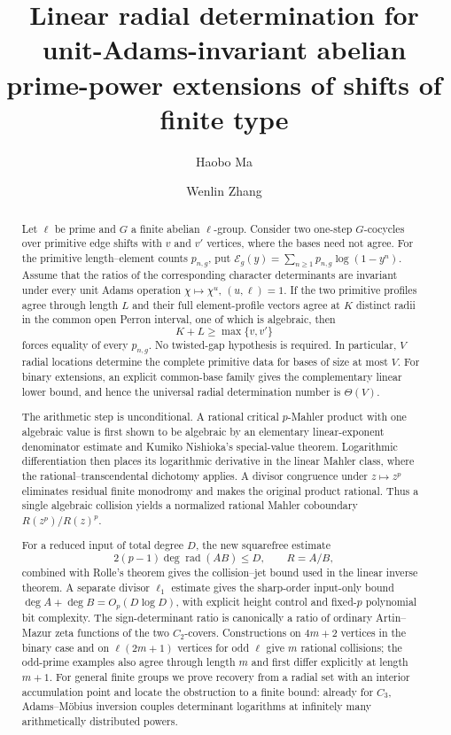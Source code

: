 \documentclass[11pt,a4paper]{amsart}
\title[Linear radial determination]{Linear radial determination for
unit-Adams-invariant abelian prime-power extensions of shifts of finite type}
\author[Haobo Ma]{Haobo Ma}
\author[Wenlin Zhang]{Wenlin Zhang}
\date{}
\theoremstyle{plain}
\theoremstyle{definition}
\theoremstyle{remark}
\DeclareMathOperator{\rad}{rad}
\begin{document}
\begin{abstract}
Let \(\ell\) be prime and \(G\) a finite abelian \(\ell\)-group.  Consider
two one-step \(G\)-cocycles over primitive edge shifts with \(v\) and \(v'\)
vertices, where the bases need not agree.  For the primitive length--element
counts \(p_{n,g}\), put
\(\mathcal E_g(y)=\sum_{n\ge1}p_{n,g}\log(1-y^n)\).  Assume that the ratios of
the corresponding character determinants are invariant under every unit
Adams operation \(\chi\mapsto\chi^u\), \((u,\ell)=1\).  If the two primitive
profiles agree through length \(L\) and their full element-profile vectors
agree at \(K\) distinct radii in the common open Perron interval, one of which
is algebraic, then
\[
 K+L\ge\max\{v,v'\}
\]
forces equality of every \(p_{n,g}\).  No twisted-gap hypothesis is required.
In particular, \(V\) radial locations determine the complete primitive data
for bases of size at most \(V\).  For binary extensions, an explicit
common-base family gives the complementary linear lower bound, and hence the
universal radial determination number is \(\Theta(V)\).

The arithmetic step is unconditional.  A rational critical \(p\)-Mahler
product with one algebraic value is first shown to be algebraic by an
elementary linear-exponent denominator estimate and Kumiko Nishioka's
special-value theorem.  Logarithmic differentiation then places its
logarithmic derivative in the linear Mahler class, where the
rational--transcendental dichotomy applies.  A divisor congruence under
\(z\mapsto z^p\) eliminates residual finite monodromy and makes the original
product rational.  Thus a single algebraic collision yields a normalized
rational Mahler coboundary \(R(z^p)/R(z)^p\).

For a reduced input of total degree \(D\), the new squarefree estimate
\[
 2(p-1)\deg\rad(AB)\le D,\qquad R=A/B,
\]
combined with Rolle's theorem gives the collision--jet bound used in the
linear inverse theorem.  A separate divisor \(\ell_1\) estimate gives the
sharp-order input-only bound
\(\deg A+\deg B=O_p(D\log D)\), with explicit height control and fixed-\(p\)
polynomial bit complexity.  The sign-determinant ratio is canonically a ratio
of ordinary Artin--Mazur zeta functions of the two \(C_2\)-covers.
Constructions on \(4m+2\) vertices in the binary case and on
\(\ell(2m+1)\) vertices for odd \(\ell\) give \(m\) rational collisions; the
odd-prime examples also agree through length \(m\) and first differ
explicitly at length \(m+1\).  For general finite groups we prove recovery
from a radial set with an interior accumulation point and locate the
obstruction to a finite bound: already for \(C_3\), Adams--M\"obius inversion
couples determinant logarithms at infinitely many arithmetically distributed
powers.
\end{abstract}
\end{document}
